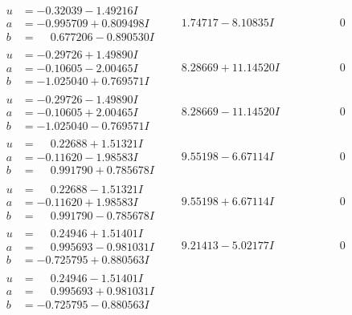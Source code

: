 \documentclass[1p]{elsarticle_modified}
\theoremstyle{definition}
\begin{document}
$$\begin{array}{c|c|c}
 \hline 
\begin{aligned}
u &= -0.32039 - 1.49216 I \\
a &= -0.995709 + 0.809498 I \\
b &= \phantom{-}0.677206 - 0.890530 I\end{aligned}
 & \phantom{-}1.74717 - 8.10835 I & \phantom{-0.000000 } 0 \\ \hline\begin{aligned}
u &= -0.29726 + 1.49890 I \\
a &= -0.10605 - 2.00465 I \\
b &= -1.025040 + 0.769571 I\end{aligned}
 & \phantom{-}8.28669 + 11.14520 I & \phantom{-0.000000 } 0 \\ \hline\begin{aligned}
u &= -0.29726 - 1.49890 I \\
a &= -0.10605 + 2.00465 I \\
b &= -1.025040 - 0.769571 I\end{aligned}
 & \phantom{-}8.28669 - 11.14520 I & \phantom{-0.000000 } 0 \\ \hline\begin{aligned}
u &= \phantom{-}0.22688 + 1.51321 I \\
a &= -0.11620 - 1.98583 I \\
b &= \phantom{-}0.991790 + 0.785678 I\end{aligned}
 & \phantom{-}9.55198 - 6.67114 I & \phantom{-0.000000 } 0 \\ \hline\begin{aligned}
u &= \phantom{-}0.22688 - 1.51321 I \\
a &= -0.11620 + 1.98583 I \\
b &= \phantom{-}0.991790 - 0.785678 I\end{aligned}
 & \phantom{-}9.55198 + 6.67114 I & \phantom{-0.000000 } 0 \\ \hline\begin{aligned}
u &= \phantom{-}0.24946 + 1.51401 I \\
a &= \phantom{-}0.995693 - 0.981031 I \\
b &= -0.725795 + 0.880563 I\end{aligned}
 & \phantom{-}9.21413 - 5.02177 I & \phantom{-0.000000 } 0 \\ \hline\begin{aligned}
u &= \phantom{-}0.24946 - 1.51401 I \\
a &= \phantom{-}0.995693 + 0.981031 I \\
b &= -0.725795 - 0.880563 I\end{aligned}

\end{array}$$
\end{document}
